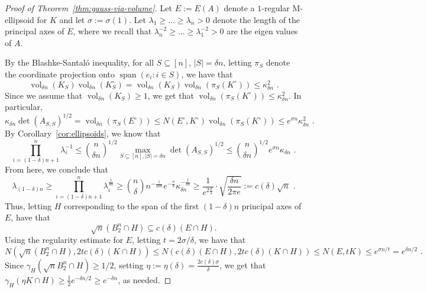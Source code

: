\documentclass[12pt]{article}
\DeclareMathOperator{\vol}{vol}
\DeclareMathOperator{\lspan}{span}
\begin{document}
\begin{proof}[Proof of Theorem~\ref{thm:gauss-via-volume}]
Let $E := E(A)$ denote a $1$-regular M-ellipsoid for $K$ and let $\sigma :=
\sigma(1)$. Let $\lambda_1 \geq \dots \geq \lambda_n > 0$ denote
the length of the principal axes of $E$, where we recall that
$\lambda_n^{-2}\geq \dots \geq \lambda_1^{-2} > 0$ are the eigen values of $A$.

By the Blashke-Santal{\'o} inequality, for all $S \subseteq
[n]$, $|S|=\delta n$, letting $\pi_S$ denote the coordinate projection onto
$\lspan(e_i:i \in S)$, we have that 
\[
\vol_{\delta n}(K_S)\vol_{\delta n}(K_S^\circ) = 
\vol_{\delta n}(K_S) \vol_{\delta n}(\pi_S(K^\circ)) \leq
\kappa_{\delta n}^2 \text{ .}
\]
Since we assume that $\vol_{\delta n}(K_S) \geq 1$, we get that
$\vol_{\delta n}(\pi_S(K^\circ)) \leq \kappa_{\delta n}^2$. In particular, 
\[
\kappa_{\delta n} \det(A_{S,S})^{1/2} = \vol_{\delta n}(\pi_S(E^\circ)) \leq N(E^\circ,K^\circ)
\vol_{ \delta n}(\pi_S(K^\circ)) \leq e^{\sigma n} \kappa_{\delta n}^2 \text{ .}
\]
By Corollary~\ref{cor:ellipsoids}, we know that
\[
\prod_{i=(1-\delta)n+1}^n \lambda_i^{-1} \leq \binom{n}{\delta n}^{1/2} \max_{S \subseteq
[n],|S|=\delta n} \det(A_{S,S})^{1/2} \leq \binom{n}{\delta n}^{1/2} e^{\sigma n}
\kappa_{\delta n} \text{ .}
\]
From here, we conclude that 
\[
\lambda_{(1-\delta)n} \geq \prod_{i=(1-\delta)n+1}^n \lambda_i^{\frac{1}{\delta
n}} \geq \binom{n}\delta {
n}^{-\frac{1}{2\delta n}} e^{-\frac{\sigma}{\delta }} \kappa_{\delta
n}^{-\frac{1}{\delta n}} \geq 
\frac{1}{e^{2\frac{\sigma}{\delta }}} \cdot \sqrt{\frac{\delta n}{2\pi e}} :=
c(\delta) \sqrt{n} \text{ .}
\] 
Thus, letting $H$ corresponding to the span of the first $(1-\delta)n$ principal
axes of $E$, have that 
\[
\sqrt{n} (B_2^n \cap H) \subseteq c(\delta) (E \cap H). 
\]
Using the regularity estimate for $E$, letting $t = 2 \sigma / \delta$, we have that
\[
N(\sqrt{n} (B_2^n \cap H), 2 t c(\delta) (K \cap H))
\leq N(c(\delta)(E \cap H), 2 t c(\delta) (K \cap H)) 
\leq N(E, t K) \leq e^{\sigma n / t} = e^{\delta n/2} \text{ .}
\] 
Since $\gamma_H(\sqrt{n} B_2^n \cap H) \geq 1/2$, setting $\eta := \eta(\delta)
=\frac{2c(\delta)\sigma}{\delta}$, we get that $\gamma_H(\eta K \cap H) \geq
\frac{1}{2} e^{-\delta n/2} \geq e^{-\delta n}$, as needed.
\end{proof}
% 
% 
\end{document}
